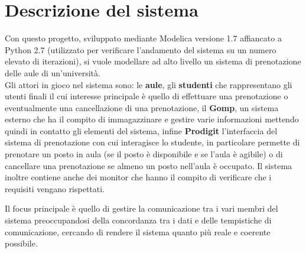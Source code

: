 \chapter*{Descrizione del sistema}
Con questo progetto, sviluppato mediante Modelica versione 1.7 affiancato a  Python 2.7 (utilizzato per verificare l’andamento del sistema su un numero elevato di iterazioni), si   vuole modellare ad alto livello un sistema di prenotazione delle aule di un’università.\\
Gli attori in gioco nel sistema sono: le \textbf{aule}, gli \textbf{studenti} che rappresentano gli utenti finali il cui interesse principale è quello di effettuare una prenotazione o eventualmente una cancellazione di una prenotazione, il \textbf{Gomp}, un sistema esterno che ha il compito di immagazzinare e gestire varie informazioni mettendo quindi in contatto gli elementi del sistema, infine \textbf{Prodigit} l’interfaccia del sistema di prenotazione con cui interagisce lo studente, in particolare permette  di prenotare un posto in aula (se il posto è disponibile e se l’aula è agibile) o di cancellare una prenotazione  se almeno un posto nell’aula è occupato.  Il sistema inoltre contiene anche dei monitor che hanno il compito di verificare  che i requisiti vengano rispettati.
\newline
\par Il focus principale è quello di gestire la comunicazione tra i vari membri del sistema preoccupandosi della concordanza tra i dati e delle tempistiche di comunicazione, cercando di rendere il sistema quanto più reale e coerente possibile. 

